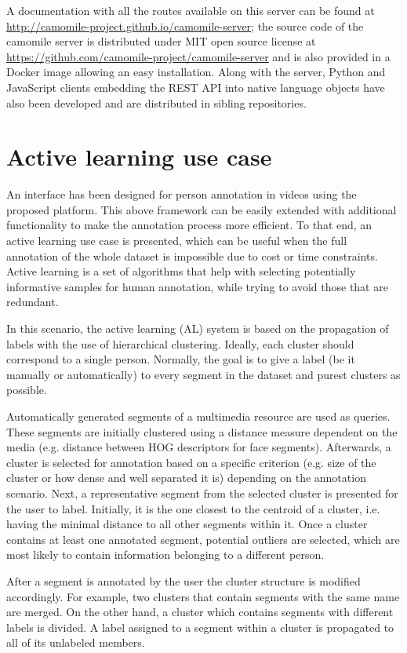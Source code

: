 \documentclass[10pt, a4paper]{article}
\begin{document}
A documentation with all the routes available on this server can be found at 
\url{http://camomile-project.github.io/camomile-server}; the source code of the camomile server is distributed under MIT open source license at
\url{https://github.com/camomile-project/camomile-server} and is also provided in a Docker image allowing an easy installation.
Along with the server, Python and JavaScript clients embedding the REST API into native language objects have also been developed and are distributed in sibling repositories.


\section{Active learning use case}

An interface has been designed for person annotation in videos using the proposed platform. This above framework can be easily extended with additional functionality to make the annotation process more efficient. To that end, an active learning use case is presented, which can be useful when the full annotation of the whole dataset is impossible due to cost or time constraints. Active learning is a set of algorithms that help with selecting  potentially informative samples for human annotation, while trying to avoid those that are redundant.

In this scenario, the active learning (AL) system is based on the propagation of labels with the use of hierarchical clustering. Ideally, each cluster should correspond to a single person. Normally, the goal is to give a label (be it manually or automatically) to every segment in the dataset and purest clusters as possible.

Automatically generated segments of a multimedia resource are used as queries. These segments are initially clustered using a distance measure dependent on the media (e.g. distance between HOG descriptors for face segments).  Afterwards, a cluster is selected for annotation based on a specific criterion (e.g. size of the cluster or how dense and well separated it is) depending on the annotation scenario. Next, a representative segment from the selected cluster is presented for the user to label. Initially, it is the one closest to the centroid of a cluster, i.e. having the minimal distance to all other segments within it. Once a cluster contains at least one annotated segment, potential outliers are selected, which are most likely to contain information belonging to a different person.

After a segment is annotated by the user the cluster structure is modified accordingly. For example, two clusters that contain segments with the same name are merged. On the other hand, a cluster which contains segments with different labels is divided. A label assigned to a segment within a cluster is propagated to all of its unlabeled members. 
\end{document}

